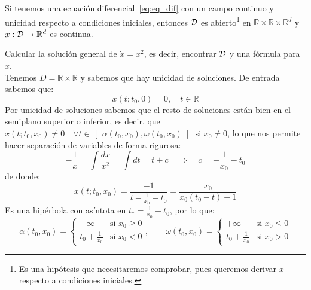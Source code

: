 \begin{teo}\label{teo:sol_general}
    Si tenemos una ecuación diferencial~\eqref{eq:eq_dif} con un campo continuo y unicidad respecto a condiciones iniciales, entonces $\mathcal{D}$ es abierto\footnote{Es una hipótesis que necesitaremos comprobar, pues queremos derivar $x$ respecto a condiciones iniciales.} en $\mathbb{R}\times\mathbb{R}\times\mathbb{R}^d$ y $x:\mathcal{D}\to \mathbb{R}^d$ es continua.
\end{teo}

\begin{ejercicio}
    Calcular la solución general de $\dot{x} = x^2$, es decir, encontrar $\mathcal{D}$ y una fórmula para $x$.\\

    \noindent
    Tenemos $D = \mathbb{R}\times \mathbb{R}$ y sabemos que hay unicidad de soluciones. De entrada sabemos que:
    \begin{equation*}
        x(t;t_0,0) = 0, \quad t\in \mathbb{R}
    \end{equation*}
    Por unicidad de soluciones sabemos que el resto de soluciones están bien en el semiplano superior o inferior, es decir, que $x(t;t_0,x_0)\neq 0 \quad \forall t\in \left]\alpha(t_0,x_0),\omega(t_0,x_0)\right[$ si $x_0\neq 0$, lo que nos permite hacer separación de variables de forma rigurosa:
    \begin{equation*}
        -\frac{1}{x} = \int \frac{dx}{x^2} = \int dt = t + c \quad\Longrightarrow\quad c = -\frac{1}{x_0}-t_0
    \end{equation*}
    de donde:
    \begin{equation*}
        x(t;t_0,x_0) = \frac{-1}{t-\frac{1}{x_0}-t_0} = \frac{x_0}{x_0(t_0-t) + 1}
    \end{equation*}
    Es una hipérbola con asíntota en $t_\ast = \frac{1}{x_0} + t_0$, por lo que:
    \begin{equation*}
        \alpha(t_0,x_0) = \left\{\begin{array}{ll}
            -\infty & \text{si\ } x_0\geq 0 \\
             t_0 + \frac{1}{x_0} & \text{si\ } x_0 < 0
        \end{array}\right. , \qquad 
        \omega(t_0,x_0) = \left\{\begin{array}{ll}
            +\infty & \text{si\ }x_0\leq 0  \\
             t_0 + \frac{1}{x_0}& \text{si\ } x_0 > 0
        \end{array}\right. 
    \end{equation*}
\end{ejercicio}

